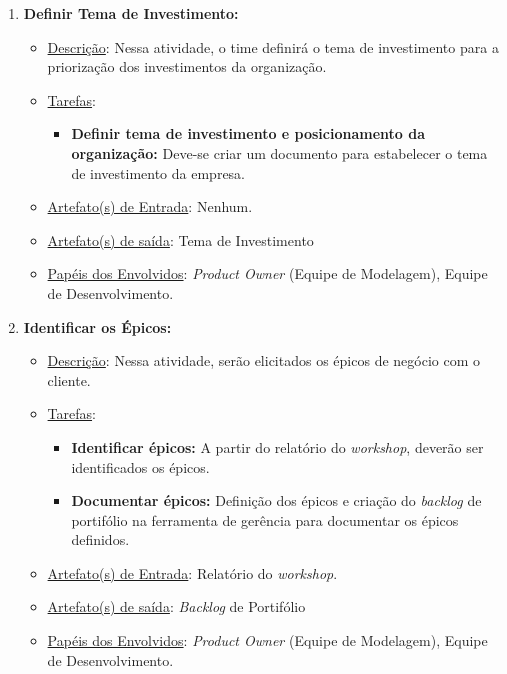 \begin{enumerate}[label = (\alph*)]
		\item \textbf{Definir Tema de Investimento:}
		\begin{itemize}
			\item \underline{Descrição}: Nessa atividade, o time definirá o tema de investimento para a priorização dos investimentos da organização.
			\item \underline{Tarefas}:
			\begin{itemize}
				\item \textbf{Definir tema de investimento e posicionamento da organização:} Deve-se criar um documento para estabelecer o tema de investimento da empresa.
			\end{itemize}
			\item \underline{Artefato(s) de Entrada}: Nenhum.
			\item \underline{Artefato(s) de saída}: Tema de Investimento
			\item \underline{Papéis dos Envolvidos}: \textit{Product Owner} (Equipe de Modelagem), Equipe de Desenvolvimento.
		\end{itemize}

		\item \textbf{Identificar os Épicos:}
		\begin{itemize}
			\item \underline{Descrição}: Nessa atividade, serão elicitados os épicos de negócio com o cliente.
			\item \underline{Tarefas}:
			\begin{itemize}
				\item \textbf{Identificar épicos:} A partir do relatório do \textit{workshop}, deverão ser identificados os épicos.
				\item \textbf{Documentar épicos:} Definição dos épicos e criação do \textit{backlog} de portifólio na ferramenta de gerência para documentar os épicos definidos.
			\end{itemize}
			\item \underline{Artefato(s) de Entrada}: Relatório do \textit{workshop}.
			\item \underline{Artefato(s) de saída}: \textit{Backlog} de Portifólio
			\item \underline{Papéis dos Envolvidos}: \textit{Product Owner} (Equipe de Modelagem), Equipe de Desenvolvimento.
		\end{itemize}
	\end{enumerate}